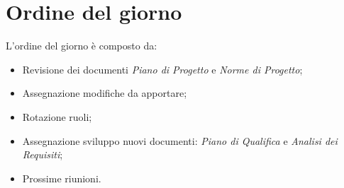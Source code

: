 \section{Ordine del giorno}
L'ordine del giorno è composto da: 
\begin{itemize}
	\item Revisione dei documenti \textit{Piano di Progetto} e \textit{Norme di Progetto}; 
	\item Assegnazione modifiche da apportare; 
	\item Rotazione ruoli;
	\item Assegnazione sviluppo nuovi documenti: \textit{Piano di Qualifica} e \textit{Analisi dei Requisiti};
	\item Prossime riunioni.
\end{itemize}
